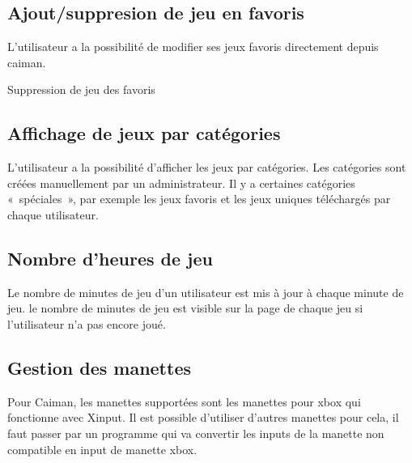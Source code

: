 \documentclass[a4paper,12pt,french]{sphinxmanual}
\begin{document}
\subsection{Ajout/suppresion de jeu en favoris}
\label{\detokenize{fonctionnelle:ajout-suppresion-de-jeu-en-favoris}}
\sphinxAtStartPar
L’utilisateur a la possibilité de modifier ses jeux favoris directement depuis caiman.

\sphinxAtStartPar
{}

\sphinxAtStartPar
Suppression de jeu des favoris

\sphinxAtStartPar
{}


\subsection{Affichage de jeux par catégories}
\label{\detokenize{fonctionnelle:affichage-de-jeux-par-categories}}
\sphinxAtStartPar
L’utilisateur a la possibilité d’afficher les jeux par catégories. Les catégories sont créées manuellement par un administrateur. Il y a certaines catégories « spéciales », par exemple les jeux favoris et les jeux uniques téléchargés par chaque utilisateur.

\sphinxAtStartPar
{}


\subsection{Nombre d’heures de jeu}
\label{\detokenize{fonctionnelle:nombre-dheures-de-jeu}}
\sphinxAtStartPar
Le nombre de minutes de jeu d’un utilisateur est mis à jour à chaque minute de jeu. le nombre de minutes de jeu est visible sur la page de chaque jeu si l’utilisateur n’a pas encore joué.

\sphinxAtStartPar
{}


\subsection{Gestion des manettes}
\label{\detokenize{fonctionnelle:gestion-des-manettes}}
\sphinxAtStartPar
Pour Caiman, les manettes supportées sont les manettes pour xbox qui fonctionne avec Xinput. Il est possible d’utiliser d’autres manettes pour cela, il faut passer par un programme qui va convertir les inputs de la manette non compatible en input de manette xbox.
\end{document}
